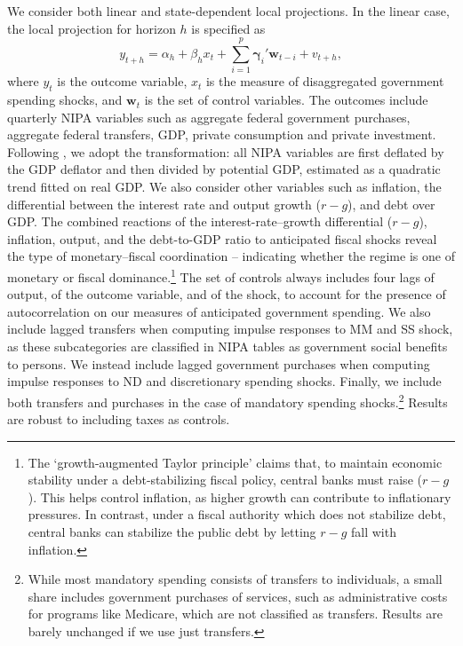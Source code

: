 \documentclass[12pt]{article}%
\theoremstyle{remark}
\begin{document}
We consider both linear and state-dependent local projections. In the linear case, the local projection for horizon $h$ is specified as  
\begin{equation} \label{eq:linearLP}
y_{t+h} = \alpha_h + \beta_h x_t + \sum_{i=1}^p \bm{\gamma}_i' \bm{w}_{t-i} + v_{t+h},
\end{equation}
where $y_t$ is the outcome variable, $x_t$ is the measure of disaggregated government spending shocks, and $\bm{w}_t$ is the set of control variables. The outcomes include quarterly NIPA variables such as aggregate federal government purchases, aggregate federal transfers, GDP, private consumption and private investment. 
Following \citet{Ramey2016}, we adopt the  transformation: all NIPA variables are first deflated by the GDP deflator and then divided by potential GDP, estimated as a quadratic trend fitted on real GDP.
We also consider other variables such as inflation, the differential between the interest rate and output growth ($r-g$), and debt over GDP. The combined reactions of the interest-rate–growth differential ($r-g$), inflation, output, and the debt-to-GDP ratio to anticipated fiscal shocks reveal the type of monetary–fiscal coordination -- indicating whether the regime is one of monetary or fiscal dominance.\footnote{The ‘growth-augmented Taylor principle' \citep[see][]{ElfsbackaMcClung2024} claims that, to maintain economic stability under a debt-stabilizing fiscal policy, central banks must raise ($r-g$). This helps control inflation, as higher growth can contribute to inflationary pressures. In contrast, under a fiscal authority which does not stabilize debt, central banks can stabilize the public debt by letting $r-g$ fall with inflation.}
The set of controls always includes four lags of output, of the outcome variable, and of the shock, to account for the presence of autocorrelation on our measures of anticipated government spending. We also include lagged transfers when computing impulse responses to MM and SS shock, as these subcategories are classified in NIPA tables as government social benefits to persons. We instead include lagged government purchases  when computing impulse responses to ND and discretionary spending shocks. Finally, we include both transfers and purchases in the case of mandatory spending shocks.\footnote{While most mandatory spending consists of transfers to individuals, a small share includes government purchases of services, such as administrative costs for programs like Medicare, which are not classified as transfers. Results are barely unchanged if we use just transfers.}
Results are robust to including taxes as controls.
\end{document}
